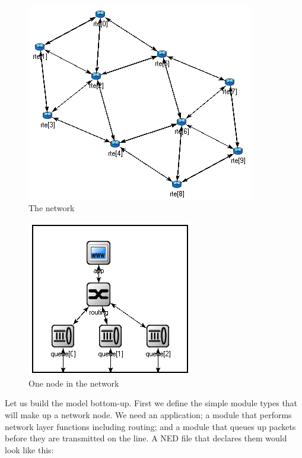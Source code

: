 \begin{figure}[htbp]
  \begin{center}
    \includegraphics[scale=0.6]{figures/ned-routing-network}
    \caption{The network}
    \label{fig:ned-routing-network}
  \end{center}
\end{figure}

\begin{figure}[htbp]
  \begin{center}
    \includegraphics[scale=0.6]{figures/ned-routing-node}
    \caption{One node in the network}
    \label{fig:ned-routing-node}
  \end{center}
\end{figure}

Let us build the model bottom-up. First we define the simple module
types that will make up a network node. We need an application;
a module that performs network layer functions including routing;
and a module that queues up packets before they are transmitted on the
line. A NED file that declares them would look like this:

